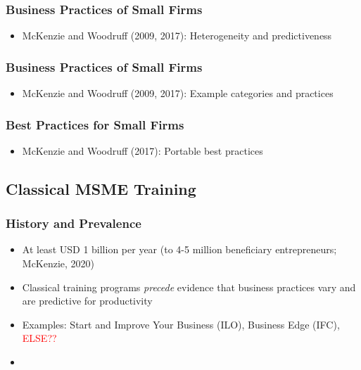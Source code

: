 \documentclass[hideothersubsections, usenames,dvipsnames,10pt]{beamer}
\begin{document}

\begin{frame}
\frametitle{Business Practices of Small Firms}
	\begin{itemize}
	\item McKenzie and Woodruff (2009, 2017): Heterogeneity and predictiveness
	\vspace{0.2in}
	\end{itemize}
\end{frame}

\begin{frame}
\frametitle{Business Practices of Small Firms}
	\begin{itemize}
	\item McKenzie and Woodruff (2009, 2017): Example categories and practices
	\vspace{0.2in}
	\end{itemize}
\end{frame}


\begin{frame}
\frametitle{Best Practices for Small Firms}
	\begin{itemize}
	\item McKenzie and Woodruff (2017): Portable best practices
	\vspace{0.2in}
	\end{itemize}
\end{frame}


\subsection{Classical MSME Training}

\begin{frame}
\frametitle{History and Prevalence}
	\begin{itemize}
	\item At least \textcolor{bleudefrance}{USD 1 billion per year} (to 4-5 million beneficiary entrepreneurs; McKenzie, 2020)
	\vspace{0.1in}
	\item Classical training programs \emph{precede} evidence that business practices vary and are predictive for productivity
	\vspace{0.2in}
	\item Examples: Start and Improve Your Business (ILO), Business Edge (IFC), \textcolor{red}{ELSE??}
	\item 
	\vspace{0.1in}
	\end{itemize}
\end{frame}
\end{document}
